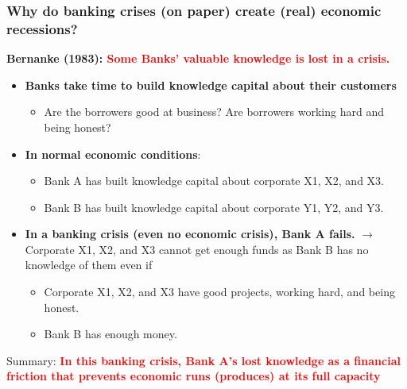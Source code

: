 \documentclass[aspectratio=169]{beamer}
\begin{document}
\begin{frame}
\frametitle{Why do banking crises (on paper) create (real) economic recessions?}

\textbf{Bernanke (1983): \textcolor{red}{Some Banks' valuable knowledge is lost in a crisis.}}
\medskip 
\begin{itemize}
    \item \textbf{Banks take time to build knowledge capital about their customers}
    \begin{itemize}
        \item Are the borrowers good at business? Are borrowers working hard and being honest? 
    \end{itemize}
    \medskip 
    \item \textbf{In normal economic conditions}: 
    \begin{itemize}
        \item Bank A has built knowledge capital about corporate X1, X2, and X3. 
        \item Bank B has built knowledge capital about corporate Y1, Y2, and Y3.
    \end{itemize}
    \medskip 
    \item \textbf{In a banking crisis (even no economic crisis), Bank A fails.} $\rightarrow$ Corporate X1, X2, and X3 cannot get enough funds as Bank B has no knowledge of them even if
    \begin{itemize}
        \item Corporate X1, X2, and X3 have good projects, working hard, and being honest. 
        \item Bank B has enough money. 
    \end{itemize}
\end{itemize}

\medskip 

Summary: \textbf{\textcolor{red}{In this banking crisis, Bank A's lost knowledge as a financial friction that prevents economic runs (produces) at its full capacity}}
\end{frame}
\end{document}
